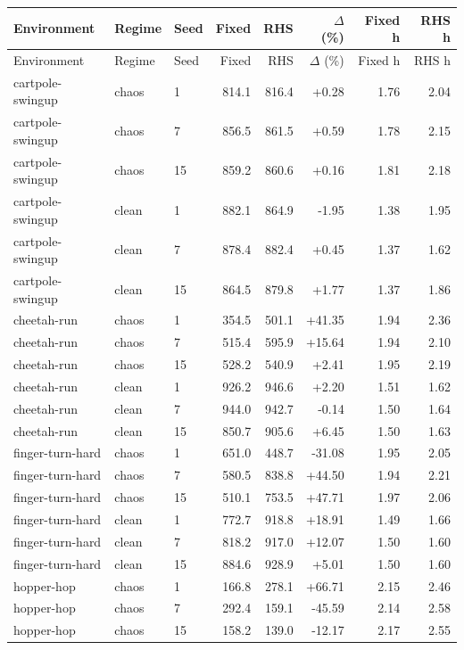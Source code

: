 \begingroup
\scriptsize
\setlength{\tabcolsep}{3.2pt}
\begin{longtable}{lllrrrrr}
\toprule
Environment & Regime & Seed & Fixed & RHS & $\Delta$ (\%) & Fixed h & RHS h \\
\midrule
\endfirsthead
\toprule
Environment & Regime & Seed & Fixed & RHS & $\Delta$ (\%) & Fixed h & RHS h \\
\midrule
\endhead
cartpole-swingup & chaos & 1 & 814.1 & 816.4 & +0.28 & 1.76 & 2.04 \\
cartpole-swingup & chaos & 7 & 856.5 & 861.5 & +0.59 & 1.78 & 2.15 \\
cartpole-swingup & chaos & 15 & 859.2 & 860.6 & +0.16 & 1.81 & 2.18 \\
cartpole-swingup & clean & 1 & 882.1 & 864.9 & -1.95 & 1.38 & 1.95 \\
cartpole-swingup & clean & 7 & 878.4 & 882.4 & +0.45 & 1.37 & 1.62 \\
cartpole-swingup & clean & 15 & 864.5 & 879.8 & +1.77 & 1.37 & 1.86 \\
cheetah-run & chaos & 1 & 354.5 & 501.1 & +41.35 & 1.94 & 2.36 \\
cheetah-run & chaos & 7 & 515.4 & 595.9 & +15.64 & 1.94 & 2.10 \\
cheetah-run & chaos & 15 & 528.2 & 540.9 & +2.41 & 1.95 & 2.19 \\
cheetah-run & clean & 1 & 926.2 & 946.6 & +2.20 & 1.51 & 1.62 \\
cheetah-run & clean & 7 & 944.0 & 942.7 & -0.14 & 1.50 & 1.64 \\
cheetah-run & clean & 15 & 850.7 & 905.6 & +6.45 & 1.50 & 1.63 \\
finger-turn-hard & chaos & 1 & 651.0 & 448.7 & -31.08 & 1.95 & 2.05 \\
finger-turn-hard & chaos & 7 & 580.5 & 838.8 & +44.50 & 1.94 & 2.21 \\
finger-turn-hard & chaos & 15 & 510.1 & 753.5 & +47.71 & 1.97 & 2.06 \\
finger-turn-hard & clean & 1 & 772.7 & 918.8 & +18.91 & 1.49 & 1.66 \\
finger-turn-hard & clean & 7 & 818.2 & 917.0 & +12.07 & 1.50 & 1.60 \\
finger-turn-hard & clean & 15 & 884.6 & 928.9 & +5.01 & 1.50 & 1.60 \\
hopper-hop & chaos & 1 & 166.8 & 278.1 & +66.71 & 2.15 & 2.46 \\
hopper-hop & chaos & 7 & 292.4 & 159.1 & -45.59 & 2.14 & 2.58 \\
hopper-hop & chaos & 15 & 158.2 & 139.0 & -12.17 & 2.17 & 2.55 \\

\end{longtable}
